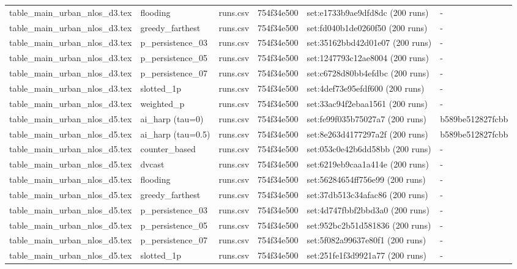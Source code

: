 \begin{tabular}{llllll}
table\_main\_urban\_nlos\_d3.tex & flooding & runs.csv & 754f34e500 & set:e1733b9ae9dfd8dc (200 runs) & - \\
table\_main\_urban\_nlos\_d3.tex & greedy\_farthest & runs.csv & 754f34e500 & set:fd040b1de0260f50 (200 runs) & - \\
table\_main\_urban\_nlos\_d3.tex & p\_persistence\_03 & runs.csv & 754f34e500 & set:35162bbd42d01e07 (200 runs) & - \\
table\_main\_urban\_nlos\_d3.tex & p\_persistence\_05 & runs.csv & 754f34e500 & set:1247793c12ae8004 (200 runs) & - \\
table\_main\_urban\_nlos\_d3.tex & p\_persistence\_07 & runs.csv & 754f34e500 & set:c6728d80bb4efdbc (200 runs) & - \\
table\_main\_urban\_nlos\_d3.tex & slotted\_1p & runs.csv & 754f34e500 & set:4def73e95efdf600 (200 runs) & - \\
table\_main\_urban\_nlos\_d3.tex & weighted\_p & runs.csv & 754f34e500 & set:33ac94f2ebaa1561 (200 runs) & - \\
table\_main\_urban\_nlos\_d5.tex & ai\_harp (tau=0) & runs.csv & 754f34e500 & set:fe99f035b75027a7 (200 runs) & b589be512827fcbb \\
table\_main\_urban\_nlos\_d5.tex & ai\_harp (tau=0.5) & runs.csv & 754f34e500 & set:8e263d4177297a2f (200 runs) & b589be512827fcbb \\
table\_main\_urban\_nlos\_d5.tex & counter\_based & runs.csv & 754f34e500 & set:053c0e42b6dd58bb (200 runs) & - \\
table\_main\_urban\_nlos\_d5.tex & dvcast & runs.csv & 754f34e500 & set:6219eb9caa1a414e (200 runs) & - \\
table\_main\_urban\_nlos\_d5.tex & flooding & runs.csv & 754f34e500 & set:56284654ff756e99 (200 runs) & - \\
table\_main\_urban\_nlos\_d5.tex & greedy\_farthest & runs.csv & 754f34e500 & set:37db513c34afac86 (200 runs) & - \\
table\_main\_urban\_nlos\_d5.tex & p\_persistence\_03 & runs.csv & 754f34e500 & set:4d747fbbf2bbd3a0 (200 runs) & - \\
table\_main\_urban\_nlos\_d5.tex & p\_persistence\_05 & runs.csv & 754f34e500 & set:952bc2b51d581836 (200 runs) & - \\
table\_main\_urban\_nlos\_d5.tex & p\_persistence\_07 & runs.csv & 754f34e500 & set:5f082a99637e80f1 (200 runs) & - \\
table\_main\_urban\_nlos\_d5.tex & slotted\_1p & runs.csv & 754f34e500 & set:251fe1f3d9921a77 (200 runs) & - \\

\end{tabular}
